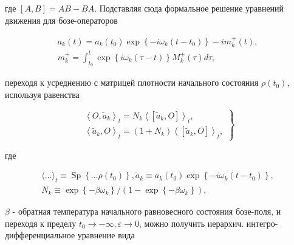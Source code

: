 \documentclass[10pt]{article}
\begin{document}
где $[A, B]=A B-B A$. Подставляя сюда формальное решение уравнений движения для бозе-операторов



\[

\begin{gathered}

a_{k}(t)=a_{k}\left(t_{0}\right) \exp \left\{-i \omega_{k}\left(t-t_{0}\right)\right\}-i m_{k}^{+}(t), \\

m_{k}^{+}=\int_{t_{0}}^{t} \exp \left\{i \omega_{k}(\tau-t)\right\} M_{k}^{+}(\tau) d \tau,

\end{gathered}

\]



переходя к усреднению с матрицей плотности начального состояния $\rho\left(t_{0}\right)$, используя равенства



\[

\left.\begin{array}{l}

\left\langle O, \tilde{a}_{k}\right\rangle_{t}=N_{k}\left\langle\left[\tilde{a}_{k}, O\right]\right\rangle_{t}, \\

\left\langle\tilde{a}_{k}, O\right\rangle_{t}=\left(1+N_{k}\right)\left\langle\left[\tilde{a}_{k}, O\right]\right\rangle_{t},

\end{array}\right\}

\]



где



\[

\begin{gathered}

\langle\ldots\rangle_{t} \equiv \operatorname{Sp}\left\{\ldots \rho\left(t_{0}\right)\right\}, \tilde{a}_{k} \equiv a_{k}\left(t_{0}\right) \exp \left\{-i \omega_{k}\left(t-t_{0}\right)\right\}, \\

N_{k} \equiv \exp \left\{-\beta \omega_{k}\right\} /\left(1-\exp \left\{-\beta \omega_{k}\right\}\right),

\end{gathered}

\]



$\beta$ - обратная температура начального равновесного состояния бозе-поля, и переходя к пределу $t_{0} \rightarrow-\infty, \varepsilon \rightarrow 0$, можно получить иерархич. интегро-дифференциальное уравнение вида
\end{document}
